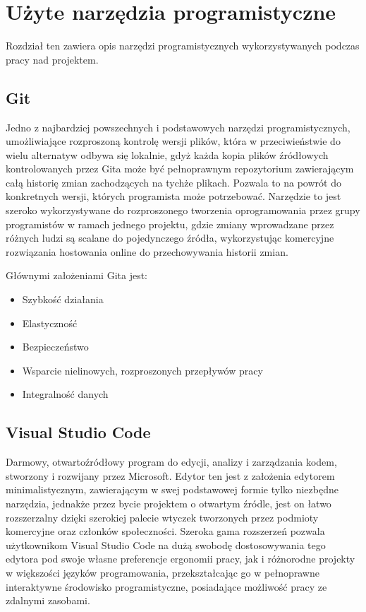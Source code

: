 \chapter{Użyte narzędzia programistyczne}
Rozdział ten zawiera opis narzędzi programistycznych wykorzystywanych podczas pracy nad projektem. 

\section{Git}
Jedno z najbardziej powszechnych i podstawowych narzędzi programistycznych, umożliwiające rozproszoną kontrolę wersji plików, która w przeciwieństwie do wielu alternatyw odbywa się lokalnie, gdyż każda kopia plików źródłowych kontrolowanych przez Gita może być pełnoprawnym repozytorium zawierającym całą historię zmian zachodzących na tychże plikach. Pozwala to na powrót do konkretnych wersji, których programista może potrzebować. Narzędzie to jest szeroko wykorzystywane do rozproszonego tworzenia oprogramowania przez grupy programistów w ramach jednego projektu, gdzie zmiany wprowadzane przez różnych ludzi są scalane do pojedynczego źródła, wykorzystując komercyjne rozwiązania hostowania online do przechowywania historii zmian.

Głównymi założeniami Gita jest:
\begin{itemize}
	\item Szybkość działania
	\item Elastyczność
	\item Bezpieczeństwo
	\item Wsparcie nielinowych, rozproszonych przepływów pracy
	\item Integralność danych
\end{itemize}

\section{Visual Studio Code}
Darmowy, otwartoźródłowy program do edycji, analizy i zarządzania kodem, stworzony i rozwijany przez Microsoft. Edytor ten jest z założenia edytorem minimalistycznym, zawierającym w swej podstawowej formie tylko niezbędne narzędzia, jednakże przez bycie projektem o otwartym źródle, jest on łatwo rozszerzalny dzięki szerokiej palecie wtyczek tworzonych przez podmioty komercyjne oraz członków społeczności. Szeroka gama rozszerzeń pozwala użytkownikom Visual Studio Code na dużą swobodę dostosowywania tego edytora pod swoje własne preferencje ergonomii pracy, jak i różnorodne projekty w większości języków programowania, przekształcając go w pełnoprawne interaktywne środowisko programistyczne, posiadające możliwość pracy ze zdalnymi zasobami.

